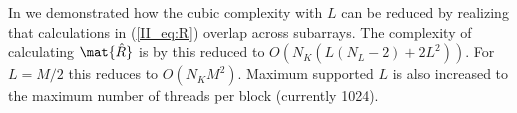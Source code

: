 In \cite{Asen2012, Buskenes} we demonstrated how the cubic complexity with $L$ %
can be reduced by realizing that calculations in (\ref{II_eq:R}) overlap across subarrays. %
The complexity of calculating $\mat{\hat{R}}$ is by this reduced to $O(N_K(L(N_L-2)+2L^2))$. For $L=M/2$ this reduces to $O(N_KM^2)$.
Maximum supported $L$ is also increased to the maximum number of threads per block (currently 1024). %


